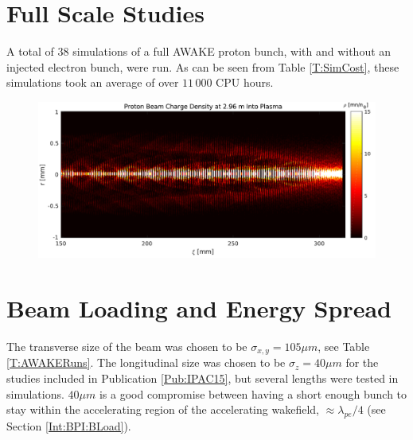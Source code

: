 \section{Full Scale Studies}
\label{Sim:FullScale}

A total of $38$ simulations of a full AWAKE proton bunch, with and without an injected electron bunch, were run.
As can be seen from Table \ref{T:SimCost}, these simulations took an average of over $11\,000$ CPU hours.

\begin{figure}[hbt]
    \centering
    \includegraphics[width=1.0\linewidth]{figures/PBSelfModulation}
    \caption{\label{Fig:Sim:SMI} }
\end{figure}

\section{Beam Loading and Energy Spread}
\label{Sim:BLoad}

The transverse size of the beam was chosen to be $\sigma_{x,y}=105\unit{\mu m}$, see Table \ref{T:AWAKERuns}.
The longitudinal size was chosen to be $\sigma_{z}=40\unit{\mu m}$ for the studies included in Publication \ref{Pub:IPAC15}, but several lengths were tested in simulations.
$40\unit{\mu m}$ is a good compromise between having a short enough bunch to stay within the accelerating region of the accelerating wakefield, $\approx \lambda_{pe}/4$ (see Section \ref{Int:BPI:BLoad}).

